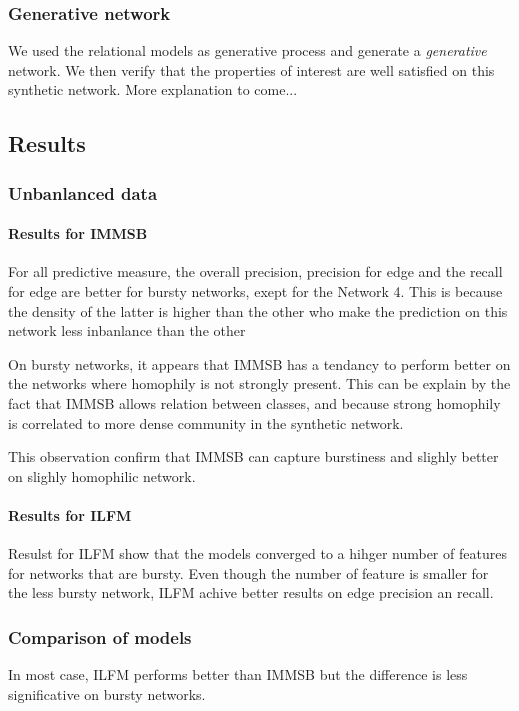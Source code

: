 \subsubsection{Generative network}
We used the relational models as generative process and generate a \emph{generative} network. We then verify that the properties of interest are well satisfied on this synthetic network. More explanation to come...


\subsection{Results}

\subsubsection{Unbanlanced data}

\paragraph{Results for IMMSB}

For all predictive measure, the overall precision, precision for edge and the recall for edge are better for bursty networks, exept for the Network 4. This is because the density of the latter is higher than the other who make the prediction on this network less inbanlance than the other

On bursty networks, it appears that IMMSB has a tendancy to perform better on the networks where homophily is not strongly present. This can be explain by the fact that IMMSB allows relation between classes, and because strong homophily is correlated to more dense community in the synthetic network.


This observation confirm that IMMSB can capture burstiness and slighly better on slighly homophilic network.

\paragraph{Results for ILFM}
Resulst for ILFM show that the models converged to a hihger number of features for networks that are bursty. Even though the number of feature is smaller for the less bursty network, ILFM achive better  results on edge precision an recall.

\subsubsection{Comparison of models}
In most case, ILFM performs better than IMMSB but the difference is less significative on bursty networks.

